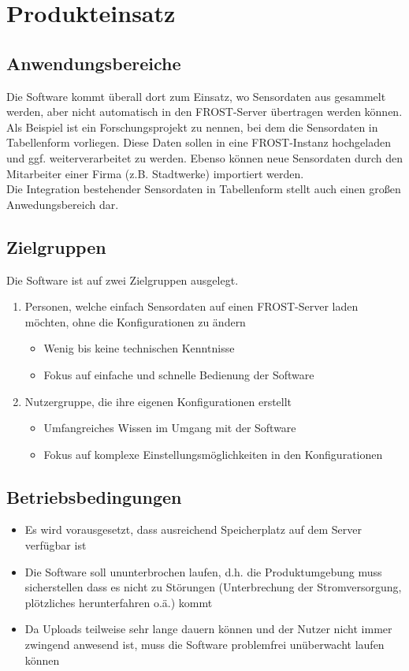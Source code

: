 \documentclass[a4paper, 12 pt]{article}
\begin{document}
\pagebreak
\section{Produkteinsatz}
\subsection{Anwendungsbereiche}
Die Software kommt überall dort zum Einsatz, wo Sensordaten aus gesammelt werden, aber nicht automatisch in den FROST-Server übertragen werden können.\\
Als Beispiel ist ein Forschungsprojekt zu nennen, bei dem die Sensordaten in Tabellenform vorliegen. Diese Daten sollen in eine FROST-Instanz hochgeladen und ggf. weiterverarbeitet zu werden. Ebenso können neue Sensordaten durch den Mitarbeiter einer Firma (z.B. Stadtwerke) importiert werden.\\
Die Integration bestehender Sensordaten in Tabellenform stellt auch einen großen Anwedungsbereich dar.
	

	\subsection{Zielgruppen}
	Die Software ist auf zwei Zielgruppen ausgelegt.\\
	\begin{enumerate}
		\item Personen, welche einfach Sensordaten auf einen FROST-Server laden möchten, ohne die Konfigurationen zu ändern
		
		\begin{itemize}
			\item Wenig bis keine technischen Kenntnisse
			\item Fokus auf einfache und schnelle Bedienung der Software
		\end{itemize}
		
		\item Nutzergruppe, die ihre eigenen Konfigurationen erstellt
		\begin{itemize}
			\item Umfangreiches Wissen im Umgang mit der Software
			\item Fokus auf komplexe Einstellungsmöglichkeiten in den Konfigurationen
		\end{itemize} 
	\end{enumerate}
	
\subsection{Betriebsbedingungen}
\begin{itemize}
	\item Es wird vorausgesetzt, dass ausreichend Speicherplatz auf dem Server verfügbar ist
	\item Die Software soll ununterbrochen laufen, d.h. die Produktumgebung muss sicherstellen dass es nicht zu Störungen (Unterbrechung der Stromversorgung, plötzliches herunterfahren o.ä.) kommt
	\item Da Uploads teilweise sehr lange dauern können und der Nutzer nicht immer zwingend anwesend ist, muss die Software problemfrei unüberwacht laufen können
\end{itemize}
	
\end{document}
